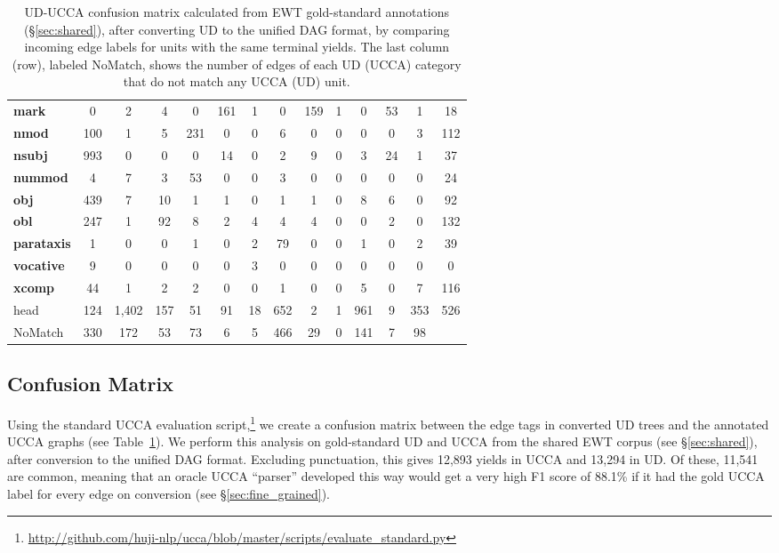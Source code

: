 \documentclass[11pt,a4paper]{article}
\begin{document}
\begin{table}[t]
\begin{tabular}{l|cccccccccccc|c}
\bf mark & 0 & 2 & 4 & 0 & 161 & 1 & 0 & 159 & 1 & 0 & 53 & 1 & 18 \\
\bf nmod & 100 & 1 & 5 & 231 & 0 & 0 & 6 & 0 & 0 & 0 & 0 & 3 & 112 \\
\bf nsubj & 993 & 0 & 0 & 0 & 14 & 0 & 2 & 9 & 0 & 3 & 24 & 1 & 37 \\
\bf nummod & 4 & 7 & 3 & 53 & 0 & 0 & 3 & 0 & 0 & 0 & 0 & 0 & 24 \\
\bf obj & 439 & 7 & 10 & 1 & 1 & 0 & 1 & 1 & 0 & 8 & 6 & 0 & 92 \\
\bf obl & 247 & 1 & 92 & 8 & 2 & 4 & 4 & 4 & 0 & 0 & 2 & 0 & 132 \\
\bf parataxis & 1 & 0 & 0 & 1 & 0 & 2 & 79 & 0 & 0 & 1 & 0 & 2 & 39 \\
\bf vocative & 9 & 0 & 0 & 0 & 0 & 3 & 0 & 0 & 0 & 0 & 0 & 0 & 0 \\
\bf xcomp & 44 & 1 & 2 & 2 & 0 & 0 & 1 & 0 & 0 & 5 & 0 & 7 & 116 \\
\hline
head & 124 & 1,402 & 157 & 51 & 91 & 18 & 652 & 2 & 1 & 961 & 9 & 353 & 526 \\
{\sc NoMatch} & 330 & 172 & 53 & 73 & 6 & 5 & 466 & 29 & 0 & 141 & 7 & 98
\end{tabular}
\caption{UD-UCCA confusion matrix calculated from EWT
gold-standard annotations (\S\ref{sec:shared}),
after converting UD to the unified DAG format,
by comparing incoming edge labels for units with the same terminal yields.
The last column (row), labeled {\sc NoMatch}, shows the number of edges of each UD (UCCA) category
that do not match any UCCA (UD) unit.
\label{tab:confusion_matrix}}
\end{table}

\subsection{Confusion Matrix}\label{sec:confusion}

Using the standard UCCA evaluation
script,\footnote{\url{http://github.com/huji-nlp/ucca/blob/master/scripts/evaluate_standard.py}}
we create a confusion matrix between the edge tags in converted UD trees
and the annotated UCCA graphs (see Table~\ref{tab:confusion_matrix}).
We perform this analysis on gold-standard UD and UCCA from the shared EWT corpus
(see \S\ref{sec:shared}),
after conversion to the unified DAG format.
Excluding punctuation, this gives 12,893 yields in UCCA and
13,294 in UD.
Of these, 11,541 are common, meaning that an oracle UCCA ``parser'' developed this way
would get a very high F1 score
of 88.1\% if it had the gold UCCA label for every edge on conversion
(see \S\ref{sec:fine_grained}).
\end{document}
